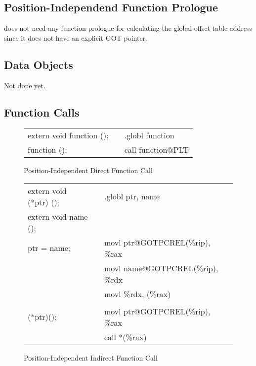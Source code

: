 \subsection{Position-Independend Function Prologue}

\xARCH does not need any function prologue for calculating the global
offset table address since it does not have an explicit GOT pointer.

\subsection{Data Objects}

Not done yet.

\subsection{Function Calls}

\begin{figure}[H]
\Hrule
\caption{Position-Independent Direct Function Call}
\begin{center}
\begin{tabular}{|l|c|l|}
\cline{1-1}\cline{3-3}
extern void function ();  &&.globl function\\
function ();              &&call function@PLT\\
\cline{1-1}\cline{3-3}
\end{tabular}
\end{center}
\Hrule
\end{figure}

\begin{figure}[H]
\Hrule
\caption{Position-Independent Indirect Function Call}
\begin{center}
\begin{tabular}{|l|c|l|}
\cline{1-1}\cline{3-3}
extern void (*ptr) ();    &&.globl ptr, name\\
extern void name ();      && \\
ptr = name;               &&movl ptr@GOTPCREL(\%rip), \%rax  \\
                          &&movl name@GOTPCREL(\%rip), \%rdx  \\
                          &&movl \%rdx, (\%rax)  \\
                          &&  \\
(*ptr)();                 &&movl ptr@GOTPCREL(\%rip), \%rax  \\
                          &&call *(\%rax)  \\
\cline{1-1}\cline{3-3}
\end{tabular}
\end{center}
\Hrule
\end{figure}

